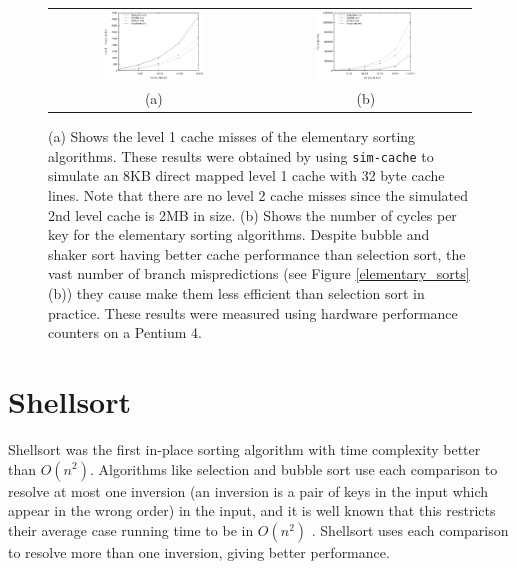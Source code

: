 \documentclass[acmtocl]{acmtrans2m}
\begin{document}
\begin{figure}
\centering
\begin{tabular}{cc}
\includegraphics[width=0.5\textwidth]{plots/elementary_cache1_misses.eps} & \includegraphics[width=0.5\textwidth]{plots/elementary_cycles.eps}\\
(a) & (b) \\
\end{tabular}
\caption{(a) Shows the level 1 cache misses of the elementary sorting
algorithms.  These results were obtained by using \texttt{sim-cache} to simulate
an 8KB direct mapped level 1 cache with 32 byte cache lines. Note that there are
no level 2 cache misses since the simulated 2nd level cache is 2MB in size.  (b)
Shows the number of cycles per key for the elementary sorting algorithms.
Despite bubble and shaker sort having better cache performance than selection
sort, the vast number of branch mispredictions (see Figure
\ref{elementary_sorts}(b)) they cause make them less efficient than selection
sort in practice.  These results were measured using hardware performance
counters on a Pentium 4.}
\label{shaker_plots}
\end{figure}

\section{Shellsort}

Shellsort \cite{Shell59} was the first in-place sorting algorithm with time
complexity better than $O(n^2)$.  Algorithms like selection and bubble sort use
each comparison to resolve at most one inversion (an inversion is a pair of keys
in the input which appear in the wrong order) in the input, and it is well known
that this restricts their average case running time to be in $O(n^2)$
\cite{KnuthVol3_98}. Shellsort uses each comparison to resolve more than one
inversion, giving better performance.
\end{document}
